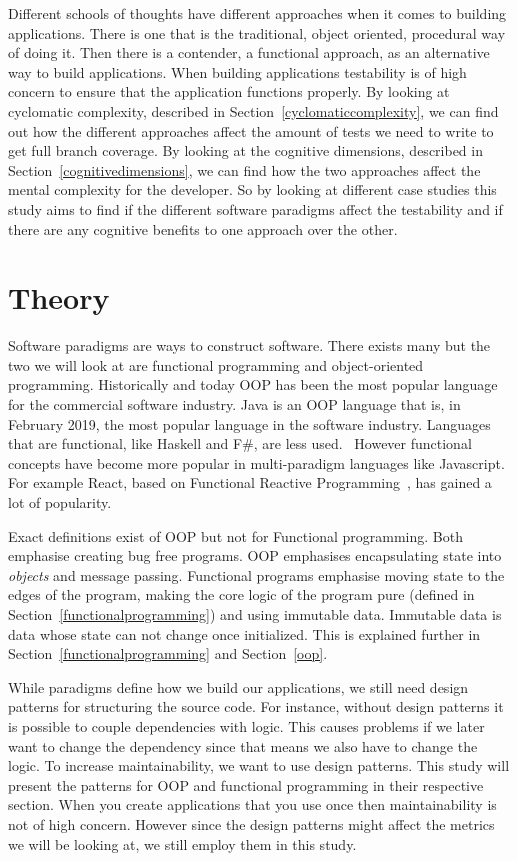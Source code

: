 \documentclass[12pt]{report}
\theoremstyle{definition}
\theoremstyle{theorem}
\begin{document}
Different schools of thoughts have different approaches when it comes to
building applications. There is one that is the traditional, object oriented,
procedural way of doing it. Then there is a contender, a functional approach, as
an alternative way to build applications. When building applications testability
is of high concern to ensure that the application functions properly. By looking
at cyclomatic complexity, described in Section~\ref{cyclomaticcomplexity}, we
can find out how the different approaches affect the amount of tests we need to
write to get full branch coverage. By looking at the cognitive dimensions,
described in Section~\ref{cognitivedimensions}, we can find how the two
approaches affect the mental complexity for the developer. So by looking at
different case studies this study aims to find if the different software
paradigms affect the testability and if there are any cognitive benefits to one
approach over the other. 

\chapter{Theory}\label{theory}

Software paradigms are ways to construct software. There exists many but the two
we will look at are functional programming and object-oriented programming.
Historically and today OOP has been the most popular language for the commercial
software industry. Java is an OOP language that is, in February 2019, the most
popular language in the software industry. Languages that are functional, like
Haskell and F\#, are less used.~\cite{tiobe} However functional concepts have
become more popular in multi-paradigm languages like Javascript.  For example
React, based on Functional Reactive Programming~\cite{reactisfrp}, has gained a
lot of popularity.~\cite{popularityreact} 

Exact definitions exist of OOP but not for Functional programming. Both
emphasise creating bug free programs. OOP emphasises encapsulating state into
\textit{objects} and message passing. Functional programs emphasise moving state
to the edges of the program, making the core logic of the program pure (defined
in Section~\ref{functionalprogramming}) and using immutable data.  Immutable
data is data whose state can not change once initialized. This is explained
further in Section~\ref{functionalprogramming} and Section~\ref{oop}.

While paradigms define how we build our applications, we still need design
patterns for structuring the source code. For instance, without design patterns
it is possible to couple dependencies with logic. This causes problems if we
later want to change the dependency since that means we also have to change the
logic. To increase maintainability, we want to use design patterns.  This
study will present the patterns for OOP and functional programming in their
respective section. When you create applications that you use once then
maintainability is not of high concern. However since the design patterns might
affect the metrics we will be looking at, we still employ them in this study.  
\end{document}
